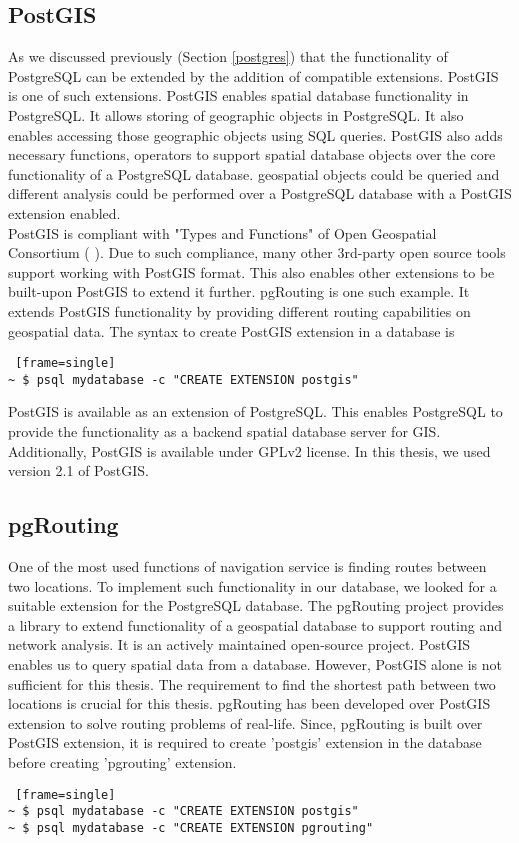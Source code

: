 \subsection{PostGIS}\label{postgis}
As we discussed previously (Section \ref{postgres}) that the functionality of PostgreSQL can be extended by the addition of compatible extensions. PostGIS \cite{holl2009postgis} is one of such extensions. PostGIS enables spatial database functionality in PostgreSQL. It allows storing of geographic objects in PostgreSQL. It also enables accessing those geographic objects using SQL queries. PostGIS also adds necessary functions, operators to support spatial database objects over the core functionality of a PostgreSQL database. geospatial objects could be queried and different analysis could be performed over a PostgreSQL database with a PostGIS extension enabled.  \\

PostGIS is compliant with "Types and Functions" of Open Geospatial Consortium ( \citet{lupp2008open} ). Due to such compliance, many other 3rd-party open source tools support working with PostGIS format. This also enables other extensions to be built-upon PostGIS to extend it further. pgRouting is one such example. It extends PostGIS functionality by providing different routing capabilities on geospatial data. The syntax to create PostGIS extension in a database is 
\begin{lstlisting} [frame=single]
~ $ psql mydatabase -c "CREATE EXTENSION postgis"
\end{lstlisting}


PostGIS is available as an extension of PostgreSQL. This enables PostgreSQL to provide the functionality as a backend spatial database server for GIS. Additionally, PostGIS is available under GPLv2 license. In this thesis, we used version {2.1} of PostGIS.
\subsection{pgRouting} \label{pgrouting}
One of the most used functions of navigation service is finding routes between two locations. To implement such functionality in our database, we looked for a suitable extension for the PostgreSQL database. The pgRouting project \cite{pgrouting} provides a library to extend functionality of a geospatial database to support routing and network analysis. It is an actively maintained open-source project. PostGIS enables us to query spatial data from a database. However, PostGIS alone is not sufficient for this thesis. The requirement to find the shortest path between two locations is crucial for this thesis. pgRouting has been developed over PostGIS extension to solve routing problems of real-life. Since, pgRouting is built over PostGIS extension, it is required to create 'postgis' extension in the database before creating 'pgrouting' extension. 
\begin{lstlisting} [frame=single]
~ $ psql mydatabase -c "CREATE EXTENSION postgis"
~ $ psql mydatabase -c "CREATE EXTENSION pgrouting"
\end{lstlisting}

